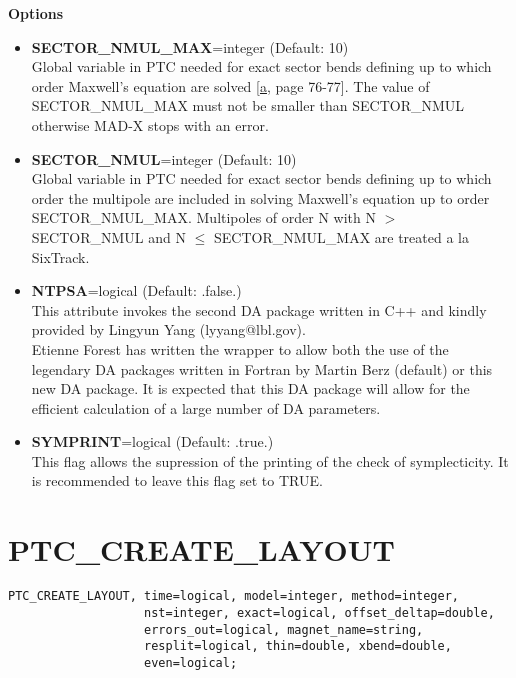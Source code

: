 {\bf Options} \\
\begin{itemize}

   \item {\bf SECTOR\_NMUL\_MAX}=integer (Default: 10) \\
     Global variable in PTC needed for exact sector bends defining up to
     which order Maxwell's equation are solved [\hyperlink{E.Forest}{a}, page
       76-77]. The value of SECTOR\_NMUL\_MAX must not be smaller than
     SECTOR\_NMUL otherwise MAD-X stops with an error. 

   \item {\bf SECTOR\_NMUL}=integer (Default: 10) \\
     Global variable in PTC needed for exact sector bends defining up to
     which order the multipole are included in solving Maxwell's
     equation up to order SECTOR\_NMUL\_MAX. Multipoles of order N with
     N $>$ SECTOR\_NMUL and N $\leq$ SECTOR\_NMUL\_MAX are treated a la
     SixTrack. 

   \item {\bf NTPSA}=logical (Default: .false.) \\
     This attribute invokes the second DA package written in C++ and
     kindly provided by Lingyun Yang (lyyang@lbl.gov). \\
     Etienne Forest has written the wrapper to allow  both the use of
     the legendary DA packages written in Fortran by  Martin Berz
     (default) or this new DA package. It is expected that this DA
     package will allow for the efficient calculation of a large number
     of DA parameters. 

   \item {\bf SYMPRINT}=logical (Default: .true.) \\
     This flag allows the supression of the printing of the check of
     symplecticity. It is recommended to leave this flag set to TRUE.  

\end{itemize}


\section{PTC\_CREATE\_LAYOUT}

\begin{verbatim}
PTC_CREATE_LAYOUT, time=logical, model=integer, method=integer, 
                   nst=integer, exact=logical, offset_deltap=double, 
                   errors_out=logical, magnet_name=string,
                   resplit=logical, thin=double, xbend=double, 
                   even=logical; 	
\end{verbatim}

